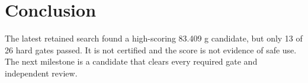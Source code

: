 \section{Conclusion}The latest retained search found a high-scoring 83.409 g candidate, but only 13 of 26 hard gates passed. It is not certified and the score is not evidence of safe use. The next milestone is a candidate that clears every required gate and independent review.
